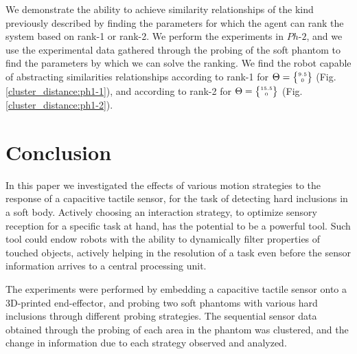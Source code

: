 \documentclass[]{interact}
\theoremstyle{plain}%
\theoremstyle{definition}
\theoremstyle{remark}
\begin{document}
We demonstrate the ability to achieve similarity relationships of the kind previously described by 
finding the parameters for which the agent can rank the system based on rank-1 or rank-2. We perform 
the experiments in $Ph\text{-}2$, and we use the experimental data gathered through the probing of the soft 
phantom to find the parameters by which we can solve the ranking. We find the robot capable of 
abstracting similarities relationships according to rank-1 for $\Theta = \tiny{\begin{Bmatrix}9.5\\ 0\end{Bmatrix}}$ (Fig. \ref{cluster_distance:ph1-1}), and according to rank-2 for $\Theta = \tiny{\begin{Bmatrix}15.5\\ 0\end{Bmatrix}}$ (Fig. \ref{cluster_distance:ph1-2}).


\section{Conclusion} 	\label{sec_conclusion}

In this paper we investigated the effects of various motion strategies to the response of a capacitive 
tactile sensor, for the task of detecting hard inclusions in a soft body. 
Actively choosing an interaction strategy, to optimize sensory reception for a specific task at hand, has 
the potential to be a powerful tool. Such tool could endow robots with the ability to dynamically filter  
properties of touched objects, actively helping in the resolution of a task even before 
the sensor information arrives to a central processing unit. 

The experiments were performed by embedding a capacitive tactile sensor onto a 3D-printed end-effector, 
and probing two soft phantoms with various hard inclusions through different probing strategies. 
The sequential sensor data obtained through the probing of each area in the phantom was clustered, 
and the change in information due to each strategy observed and analyzed. 
\end{document}
